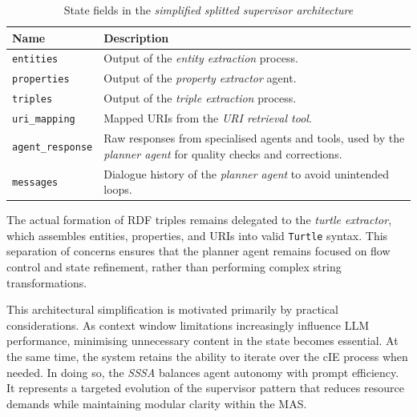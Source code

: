 \documentclass[a4paper,oneside,bibliography=totoc]{scrbook}
\begin{document}
\begin{table}[h]
  \centering
  \caption{State fields in the \textit{simplified splitted supervisor architecture}}
  \label{tab:sssa_state}
  \begin{tabular}{p{3cm}p{10cm}}
    \toprule
    \textbf{Name}            & \textbf{Description}                                                                                                    \\
    \midrule
    \texttt{entities}        & Output of the \textit{entity extraction} process.                                                                       \\
    \texttt{properties}      & Output of the \textit{property extractor} agent.                                                                        \\
    \texttt{triples}         & Output of the \textit{triple extraction} process.                                                                       \\
    \texttt{uri\_mapping}    & Mapped \acp{URI} from the \textit{\ac{URI} retrieval tool}.                                                             \\
    \texttt{agent\_response} & Raw responses from specialised agents and tools, used by the \textit{planner agent} for quality checks and corrections. \\
    \texttt{messages}        & Dialogue history of the \textit{planner agent} to avoid unintended loops.                                               \\
    \bottomrule
  \end{tabular}
\end{table}

The actual formation of RDF triples remains delegated to the \textit{turtle extractor}, which assembles entities, properties, and \acp{URI} into valid \texttt{Turtle} syntax. This separation of concerns ensures that the planner agent remains focused on flow control and state refinement, rather than performing complex string transformations.

This architectural simplification is motivated primarily by practical considerations. As context window limitations increasingly influence \ac{LLM} performance, minimising unnecessary content in the state becomes essential. At the same time, the system retains the ability to iterate over the \ac{cIE} process when needed. In doing so, the \textit{\ac{SSSA}} balances agent autonomy with prompt efficiency. It represents a targeted evolution of the supervisor pattern that reduces resource demands while maintaining modular clarity within the \ac{MAS}.
\end{document}
